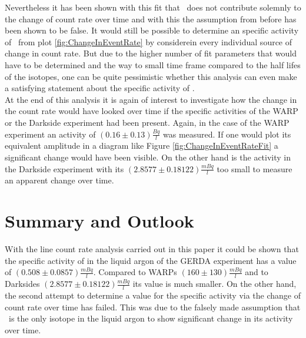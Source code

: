 \documentclass[encoding=utf8,british]{tumphthesis}
\begin{document}
Nevertheless it has been shown with this fit that \Kr\ does not contribute solemnly to the change of count rate over time and with this the assumption from before has been shown to be false.
It would still be possible to determine an specific activity of \Kr\ from plot \ref{fig:ChangeInEventRate} by considerein every individual source of change in count rate.
But due to the higher number of fit parameters that would have to be determined and the way to small time frame compared to the half lifes of the isotopes, one can be quite pessimistic whether this analysis can even make a satisfying statement about the specific activity of \Kr.
\\

At the end of this analysis it is again of interest to investigate how the change in the count rate would have looked over time if the specific activities of the WARP or the Darkside experiment had been present.
Again, in the case of the WARP experiment an activity of $(0.16\pm0.13)\frac{\unit{Bq}}{\unit{l}}$ was measured. 
If one would plot its equivalent amplitude in a diagram like Figure \ref{fig:ChangeInEventRateFit} a significant change would have been visible.
On the other hand is the activity in the Darkside experiment with its $(2.8577 \pm 0.18122) \frac{\unit{mBq}}{\unit{l}}$ too small to measure an apparent change over time.
\\



\chapter{Summary and Outlook}
\label{sec:ConcAndOutlook}

With the line count rate analysis carried out in this paper it could be shown that the specific activity of  in the liquid argon of the GERDA experiment has a value of $(0.508\pm0.0857) \frac{\unit{mBq}}{\unit{l}}$. 
Compared to WARPs $(160\pm130)\frac{\unit{mBq}}{\unit{l}}$ and to Darksides $(2.8577 \pm 0.18122) \frac{\unit{mBq}}{\unit{l}}$ its value is much smaller.
On the other hand, the second attempt to determine a value for the specific activity via the change of count rate over time has failed.
This was due to the falsely made assumption that \Kr\ is the only isotope in the liquid argon to show significant change in its activity over time.
\\
\end{document}
